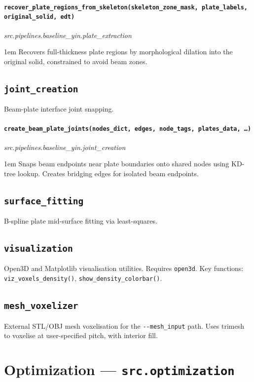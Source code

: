 \documentclass[a4paper, 11pt, openany]{report}
\newcommand{\apifunc}[2]{%
    \paragraph{\texttt{#2}}\hfill\textit{\small #1}\par\nopagebreak
}
\begin{document}
\apifunc{src.pipelines.baseline\_yin.plate\_extraction}{recover\_plate\_regions\_from\_skeleton(skeleton\_zone\_mask, plate\_labels, original\_solid, edt)}
\begin{adjustwidth}{1em}{}
Recovers full-thickness plate regions by morphological dilation into the
original solid, constrained to avoid beam zones.
\end{adjustwidth}


\subsection{\texttt{joint\_creation}}

Beam-plate interface joint snapping.

\apifunc{src.pipelines.baseline\_yin.joint\_creation}{create\_beam\_plate\_joints(nodes\_dict, edges, node\_tags, plates\_data, \ldots)}
\begin{adjustwidth}{1em}{}
Snaps beam endpoints near plate boundaries onto shared nodes using KD-tree
lookup.  Creates bridging edges for isolated beam endpoints.
\end{adjustwidth}


\subsection{\texttt{surface\_fitting}}

B-spline plate mid-surface fitting via least-squares.


\subsection{\texttt{visualization}}

Open3D and Matplotlib visualisation utilities.  Requires \texttt{open3d}.
Key functions: \texttt{viz\_voxels\_density()}, \texttt{show\_density\_colorbar()}.


\subsection{\texttt{mesh\_voxelizer}}

External STL/OBJ mesh voxelisation for the \texttt{-{}-mesh\_input} path.
Uses trimesh to voxelise at user-specified pitch, with interior fill.


\section{Optimization --- \texttt{src.optimization}}
\label{sec:api-optimization}
\end{document}
